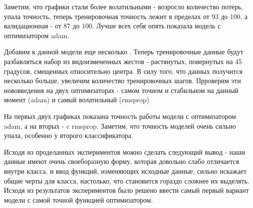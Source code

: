 Заметим, что графики стали более волатильными - возросло количество потерь, упала точность, теперь тренировочная точность лежит в пределах от 93 до 100, а валидационная - от 87 до 100. Лучше всех себя опять показала модель с оптимизатором adam. 

Добавим к данной модели еще несколько . Теперь тренировочные данные будут разбавляться набор из видоизмененных жестов - растянутых, повернутых на 45 градусов, смещенных относительно центра.
В силу того, что данных получится несколько больше, увеличим количество тренировочных шагов.
Прроверим эти нововведения на двух оптимизаторах - самом точном и стабильном на данный момент (adam) и самый волатильный (rmsprop)

\begin{figure}[H]
\end{figure}

На первых двух графиках показана точность работы модели с оптимизатором adam, а на вторых - c rmsprop. Заметим, что точность моделей очень сильно упала, особенно у второго классификатора. 

Исходя из проделанных экспериментов можно сделать следующий вывод - наши данные имеют очень своеборазную форму, которая довольно слабо отличается внутри класса, и ввод функций, изменяющих исходные данные, сильно искажает общие черты для класса, настолько, что становится гораздо сложнее их выделять.
Исходя из результатов экспериментов было решено ввести самый первый вариант модели с самой точной функцией оптимизатором.